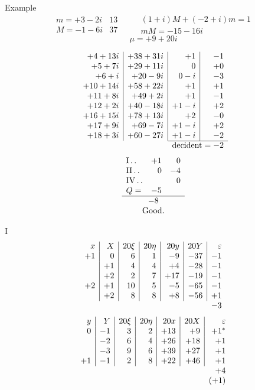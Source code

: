 Example
\[
\begin{array}{r|r}
m=+3-2i&13\\
M=-1-6i&37
\end{array}
\qquad
\begin{gathered}
(1+i)M+(-2+i)m=1\\
mM=-15-16i
\end{gathered}
\]
\[
\mu=+9+20i
\]

\[
\begin{array}{r|r|r|r}
+4+13i&+38+31i&+1&-1\\
+5+7i&+29+11i&0&+0\\
+6+i&+20-9i&0-i&-3\\
+10+14i&+58+22i&+1&+1\\
+11+8i&+49+2i&+1&-1\\
+12+2i&+40-18i&+1-i&+2\\
+16+15i&+78+13i&+2&-0\\
+17+9i&+69-7i&+1-i&+2\\
+18+3i&+60-27i&+1-i&-2\\ \cline{3-4}
\multicolumn{2}{c}{}&\multicolumn{2}{c}{\text{decident}=-2}
\end{array}
\]
\[
\begin{array}{lrr}
\mathrm{I}\dotstwo&+1&0\\
\mathrm{II}\dotstwo&0&-4\\
\mathrm{IV}\dotstwo&&0\\
Q=&-5&\\ \hline
\multicolumn{3}{c}{-8}\\
\multicolumn{3}{c}{\text{Good.}}
\end{array}
\]

\noindent I
\[
\begin{array}{r|r|r|r|r|r|r}
x&X&20\xi&20\eta&20y&20Y&\varepsilon\\
+1&0&6&1&-9&-37&-1\\
&+1&4&4&+4&-28&-1\\
&+2&2&7&+17&-19&-1\\
+2&+1&10&5&-5&-65&-1\\
&+2&8&8&+8&-56&+1\\
\multicolumn{6}{c}{}&-3
\end{array}
\]
\[
\begin{array}{r|r|r|r|r|r|r}
y&Y&20\xi&20\eta&20x&20X&\varepsilon\\
0&-1&3&2&+13&+9&+1^{*}\\
&-2&6&4&+26&+18&+1\\
&-3&9&6&+39&+27&+1\\
+1&-1&2&8&+22&+46&+1\\
\multicolumn{6}{c}{}&+4\\
\multicolumn{6}{c}{}&(+1)
\end{array}
\]

